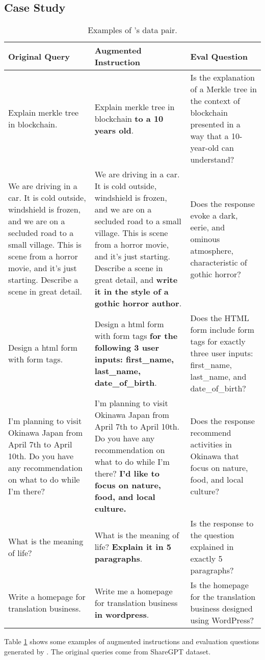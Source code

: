 \subsection{Case Study}

\begin{table}
\caption{Examples of \method's data pair.}
\label{tab:t6}
\begin{tabular}{|p{5cm}|p{5cm}|p{5cm}|}
\hline
\textbf{Original Query} & \textbf{Augmented Instruction} & \textbf{Eval Question} \\
\hline 
 Explain merkle tree in blockchain. & Explain merkle tree in blockchain \textbf{to a 10 years old}. & Is the explanation of a Merkle tree in the context of blockchain presented in a way that a 10-year-old can understand? \\
\hline
We are driving in a car. It is cold outside, windshield is frozen, and we are on a secluded road to a small village. This is scene from a horror movie, and it's just starting. Describe a scene in great detail. & We are driving in a car. It is cold outside, windshield is frozen, and we are on a secluded road to a small village. This is scene from a horror movie, and it's just starting. Describe a scene in great detail, and \textbf{write it in the style of a gothic horror author}. & Does the response evoke a dark, eerie, and ominous atmosphere, characteristic of gothic horror? \\
\hline
 Design a html form with form tags. & Design a html form with form tags \textbf{for the following 3 user inputs: first\_name, last\_name, date\_of\_birth}. & Does the HTML form include form tags for exactly three user inputs: first\_name, last\_name, and date\_of\_birth? \\
\hline
 I'm planning to visit Okinawa Japan from April 7th to April 10th. Do you have any recommendation on what to do while I'm there?& I'm planning to visit Okinawa Japan from April 7th to April 10th. Do you have any recommendation on what to do while I'm there? \textbf{I'd like to focus on nature, food, and local culture.}&Does the response recommend activities in Okinawa that focus on nature, food, and local culture? \\
\hline
 What is the meaning of life?&What is the meaning of life? \textbf{Explain it in 5 paragraphs}. &Is the response to the question explained in exactly 5 paragraphs? \\
\hline
Write a homepage for translation business.& Write me a homepage for translation business \textbf{in wordpress}.&Is the homepage for the translation business designed using WordPress? \\
\hline
\end{tabular}
\end{table}

Table \ref{tab:t6} shows some examples of augmented instructions and evaluation questions generated by \method. The original queries come from ShareGPT dataset.